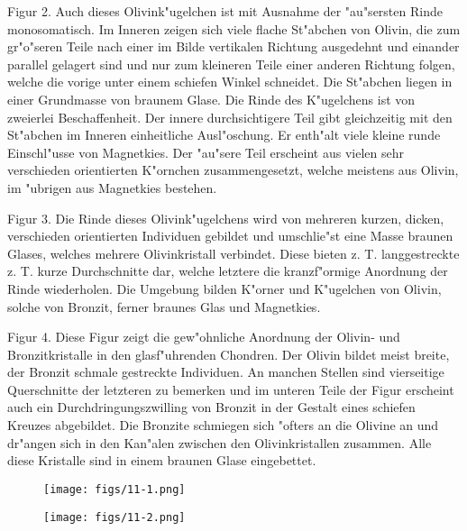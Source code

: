 \documentclass[a4paper, 11pt, oneside, polutonikogreek, german]{article}
\begin{document}
Figur 2. Auch dieses Olivink"ugelchen ist mit Ausnahme der "au"sersten Rinde monosomatisch. Im Inneren zeigen sich viele flache St"abchen von Olivin, die zum gr"o"seren Teile nach einer im Bilde vertikalen Richtung ausgedehnt und einander parallel gelagert sind und nur zum kleineren Teile einer anderen Richtung folgen, welche die vorige unter einem schiefen Winkel schneidet. Die St"abchen liegen in einer Grundmasse von braunem Glase. Die Rinde des K"ugelchens ist von zweierlei Beschaffenheit. Der innere durchsichtigere Teil gibt gleichzeitig mit den St"abchen im Inneren einheitliche Ausl"oschung. Er enth"alt viele kleine runde Einschl"usse von Magnetkies. Der "au"sere Teil erscheint aus vielen sehr verschieden orientierten K"ornchen zusammengesetzt, welche meistens aus Olivin, im "ubrigen aus Magnetkies bestehen.

Figur 3. Die Rinde dieses Olivink"ugelchens wird von mehreren kurzen, dicken, verschieden orientierten Individuen gebildet und umschlie"st eine Masse braunen Glases, welches mehrere Olivinkristall verbindet. Diese bieten z. T. langgestreckte z. T. kurze Durchschnitte dar, welche letztere die kranzf"ormige Anordnung der Rinde wiederholen. Die Umgebung bilden K"orner und K"ugelchen von Olivin, solche von Bronzit, ferner braunes Glas und Magnetkies.

Figur 4. Diese Figur zeigt die gew"ohnliche Anordnung der Olivin- und Bronzitkristalle in den glasf"uhrenden Chondren. Der Olivin bildet meist breite, der Bronzit schmale gestreckte Individuen. An manchen Stellen sind vierseitige Querschnitte der letzteren zu bemerken und im unteren Teile der Figur erscheint auch ein Durchdringungszwilling von Bronzit in der Gestalt eines schiefen Kreuzes abgebildet. Die Bronzite schmiegen sich "ofters an die Olivine an und dr"angen sich in den Kan"alen zwischen den Olivinkristallen zusammen. Alle diese Kristalle sind in einem braunen Glase eingebettet.
\clearpage

\vspace*{\fill}
\begin{figure}[H]
\centering
\texttt{[image: figs/11-1.png]}
\caption{}
\end{figure}
\vspace*{\fill}
\clearpage

\vspace*{\fill}
\begin{figure}[H]
\centering
\texttt{[image: figs/11-2.png]}
\caption{}
\end{figure}
\vspace*{\fill}
\clearpage
\end{document}
